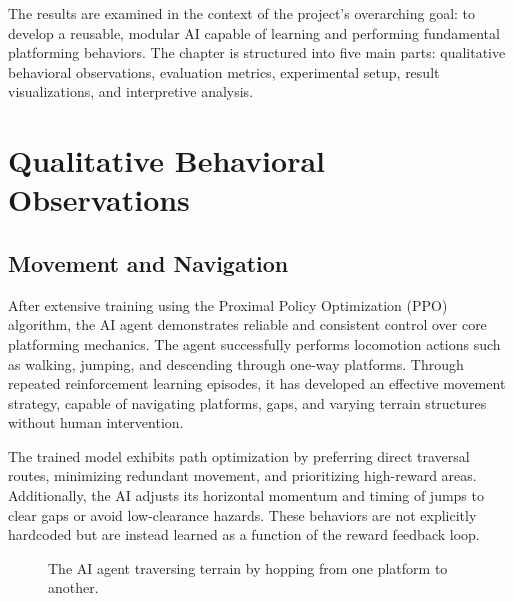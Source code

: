 \documentclass[12pt,oneside,openright,a4paper]{cpe-english-project}
\begin{document}
The results are examined in the context of the project’s overarching goal: to develop a reusable, modular AI capable of learning and performing fundamental platforming behaviors. The chapter is structured into five main parts: qualitative behavioral observations, evaluation metrics, experimental setup, result visualizations, and interpretive analysis.

\section{Qualitative Behavioral Observations}
\subsection{Movement and Navigation}

After extensive training using the Proximal Policy Optimization (PPO) algorithm, the AI agent demonstrates reliable and consistent control over core platforming mechanics. The agent successfully performs locomotion actions such as walking, jumping, and descending through one-way platforms. Through repeated reinforcement learning episodes, it has developed an effective movement strategy, capable of navigating platforms, gaps, and varying terrain structures without human intervention.

The trained model exhibits path optimization by preferring direct traversal routes, minimizing redundant movement, and prioritizing high-reward areas. Additionally, the AI adjusts its horizontal momentum and timing of jumps to clear gaps or avoid low-clearance hazards. These behaviors are not explicitly hardcoded but are instead learned as a function of the reward feedback loop.

\begin{figure}[H]
\centering
{}
\caption{The AI agent traversing terrain by hopping from one platform to another.}
\label{fig:AIJump}
\end{figure}
\end{document}

